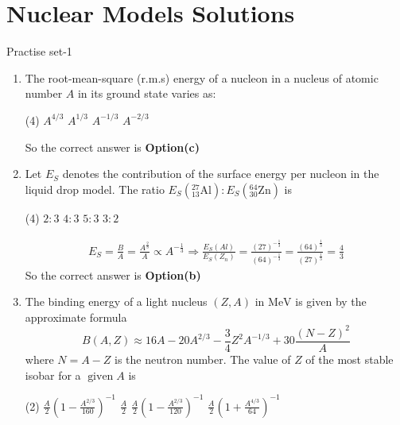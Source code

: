 \chapter{Nuclear Models Solutions}
\begin{abox}
	Practise set-1
\end{abox}
\begin{enumerate}
	\item  The root-mean-square (r.m.s) energy of a nucleon in a nucleus of atomic number $A$ in its ground state varies as:
	\begin{tasks}(4)
		\task[\textbf{a.}]$A^{4 / 3}$
		\task[\textbf{b.}]$A^{1 / 3}$
		\task[\textbf{c.}]$A^{-1 / 3}$
		\task[\textbf{d.}]$A^{-2 / 3}$ 
	\end{tasks}
	\begin{answer}
		So the correct answer is \textbf{Option(c)}
	\end{answer}
	\item  Let $E_S$ denotes the contribution of the surface energy per nucleon in the liquid drop model. The ratio $E_S\left({ }_{13}^{27} \mathrm{Al}\right): E_S\left({ }_{30}^{64} \mathrm{Zn}\right)$ is
	{}
	\begin{tasks}(4)
		\task[\textbf{a.}]$2: 3$
		\task[\textbf{b.}]$4: 3$
		\task[\textbf{c.}]$5: 3$
		\task[\textbf{d.}]$3: 2$ 
	\end{tasks}
	\begin{answer}
		\begin{align*}
		E_S=\frac{B}{A}=\frac{A^{\frac{2}{3}}}{A} \propto A^{-\frac{1}{3}} \Rightarrow \frac{E_S(A l)}{E_S\left(Z_n\right)}=\frac{(27)^{-\frac{1}{3}}}{(64)^{-\frac{1}{3}}}=\frac{(64)^{\frac{1}{3}}}{(27)^{\frac{1}{3}}}=\frac{4}{3}
		\end{align*}
		So the correct answer is \textbf{Option(b)}
	\end{answer}
	\item  The binding energy of a light nucleus $(Z, A)$ in $\mathrm{MeV}$ is given by the approximate formula
	$$
	B(A, Z) \approx 16 A-20 A^{2 / 3}-\frac{3}{4} Z^2 A^{-1 / 3}+30 \frac{(N-Z)^2}{A}
	$$
	where $N=A-Z$ is the neutron number. The value of $Z$ of the most stable isobar for a $\operatorname{given} A$ is
	{}
	\begin{tasks}(2)
		\task[\textbf{a.}] $\frac{A}{2}\left(1-\frac{A^{2 / 3}}{160}\right)^{-1}$
		\task[\textbf{b.}]$\frac{A}{2}$
		\task[\textbf{c.}]$\frac{A}{2}\left(1-\frac{A^{2 / 3}}{120}\right)^{-1}$
		\task[\textbf{d.}] $\frac{A}{2}\left(1+\frac{A^{4 / 3}}{64}\right)^{-1}$

\end{tasks}
\end{enumerate}
